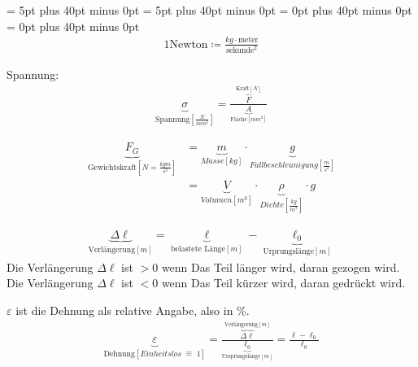 \documentclass[11pt]{article}
\newcommand{\1}{ {\mathds{1}} }
\begin{document}
    \abovedisplayskip = 5pt plus 40pt minus 0pt
    \belowdisplayskip = 5pt plus 40pt minus 0pt
    \abovedisplayshortskip = 0pt plus 40pt minus 0pt
    \belowdisplayshortskip = 0pt plus 40pt minus 0pt
    \pagestyle{fancy}
    \begin{align*}
        1 \text{Newton} \coloneqq \frac{kg \cdot \text{meter}}{\text{sekunde}^2}
    \end{align*}

    \hrulefill
    
    Spannung:
    \begin{align*}
        \underbrace{\sigma}_{\text{Spannung}\left[\frac{N}{mm^2}\right]}
        =
        \frac{\overbrace{F}^{\text{Kraft}\left[N\right]}}{\underbrace{A}_{\text{Fläche}\left[mm^2\right]}}
    \end{align*}

    \hrulefill
    \begin{align*}
        \underbrace{F_G}_{\text{Gewichtskraft} [N = \frac{kg m}{s^2}]} &= \underbrace{m}_{Masse\left[kg\right]} \cdot \underbrace{g}_{Fallbeschleunigung \left[\frac{m}{s^2}\right]} \\ 
        &= \underbrace{V}_{Volumen\left[m^3\right]} \cdot \underbrace{\rho}_{Dichte\left[\frac{kg}{m^3}\right]} \cdot g
    \end{align*}
    
    \hrulefill
    \begin{align*}
        \underbrace{\Delta \ell}_{\text{Verlängerung}\left[m\right]} = \underbrace{\ell}_{\text{belastete Länge} \left[m\right]} - \underbrace{\ell_0}_{\text{Urprungslänge} \left[m\right]}
    \end{align*}
    Die Verlängerung $\Delta \ell$ ist $>0$ wenn Das Teil länger wird, daran gezogen wird.\\
    Die Verlängerung $\Delta \ell$ ist $<0$ wenn Das Teil kürzer wird, daran gedrückt wird.

    \hrulefill
    
    $\varepsilon$ ist die Dehnung als relative Angabe, also in \%.
    \begin{align*}
        \underbrace{\varepsilon}_{\text{Dehnung} \left[Einheitslos \; \widehat{=}\; 1\right]} 
        =
        \frac{\overbrace{\Delta \ell}^{\text{Verlängerung}\left[m\right]}}{\underbrace{\ell_0}_{\text{Ursprungslänge}\left[m\right]}}
        = \frac{\ell - \ell_0}{\ell_0}
    \end{align*}

    \hrulefill
    
\end{document}

